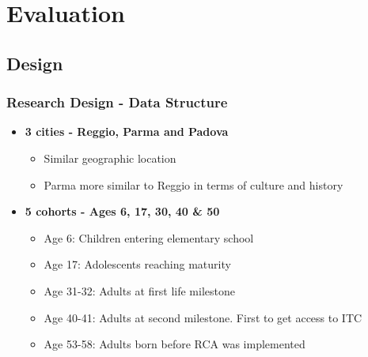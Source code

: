 \section{Evaluation}
\subsection{Design}
\begin{frame}
\frametitle{Research Design - Data Structure} 
\begin{itemize}
	\item \textbf{3 cities - Reggio, Parma and Padova}
	\begin{itemize}
		\item Similar geographic location
		\item Parma more similar to Reggio in terms of culture and history
	\end{itemize}
	\bigskip
	\item \textbf{5 cohorts - Ages 6, 17, 30, 40 \&  50}
	\begin{itemize}
		\item Age 6: Children entering elementary school
		\item Age 17: Adolescents reaching maturity
		\item Age 31-32: Adults at first life milestone
		\item Age 40-41: Adults at second milestone. First to get access to ITC
		\item Age 53-58: Adults born before RCA was implemented
	\end{itemize}
\end{itemize}
\end{frame} 

